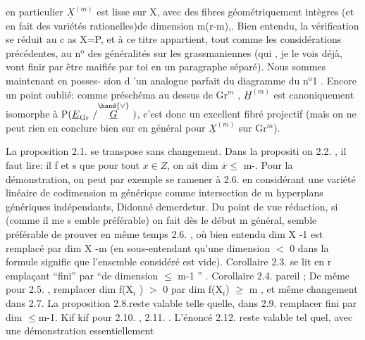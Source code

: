 
en particulier $\underline{X}^{(m)}$ est lisse sur X, avec des fibres géométriquement
intègres (et en fait des variétés rationelles)de dimension m(r-m),. Bien entendu, la
vérification se réduit au c as X=P, et à ce titre appartient, tout
\placedmargin{|}comme les considérations précédentes, au n$^{\text{o}}$ des généralités sur les
\placedmargin{|}grassmaniennes (qui , je le vois déjà, vont finir par être maifiés
\placedmargin{|}par toi en un paragraphe séparé). Nous sommes maintenant en posses-%
sion d 'un analogue parfait du diagramme du n$^{\text{o}}$1 . Encore un point
oublié: comme préschéma au dessus de Gr$^{m}$ , $\underline{H}^{(m)}$ est canoniquement
isomorphe à P$(\underline{E}_{\mathrm{Gr}}\ /\overset{\hand{\vee}}{\underline{G}}\ )$, c'est donc un excellent fibré projectif
(mais on ne peut rien en conclure bien sur en général pour $\underline{X}^{(m)}$ sur
Gr$^{m}$).

La proposition 2.1. se transpose sans changement. Dans la
propositi on 2.2. , il faut lire: il f et s que pour tout $x \in Z$, on
ait  dim $\overline{x} \leqslant$ m-. Pour la démonstration, on peut par exemple
se ramener à 2.6. en considérant une  variété linéaire de
codimension m générique comme intersection de m hyperplans génériques
indépendants, Didonné demerdetur. Du point de vue rédaction, si
(comme il me s emble préférable) on fait dès le début m général, 
semble préférable de prouver en même temps 2.6. , où bien entendu
dim X -1 est remplacé par dim X -m (en sous-entendant qu'une dimension
$<$ 0 dans la formule signifie que l'ensemble considéré est vide).
Corollaire 2.3. se lit en r emplaçant ``fini'' par ``de dimension $\leqslant$ 
m-1 '' . Corollaire 2.4. pareil ; De même pour 2.5. , remplacer
dim f(X$_{i}$ ) $>$ 0 par dim f(X$_{i}$) $\geqslant$ m , et même changement dans 2.7.
La proposition 2.8.reste valable telle quelle, dans 2.9. remplacer
fini par dim $\leqslant$m-1. Kif kif pour 2.10. , 2.11. . L'énoncé
2.12. reste valable tel quel, avec une démonstration essentiellement

